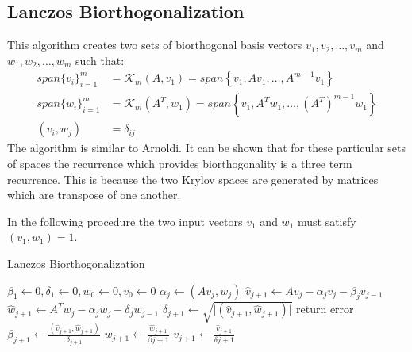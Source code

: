 \subsection{Lanczos Biorthogonalization}
This algorithm creates two sets of biorthogonal basis vectors $v_1, v_2, \dots, v_m$ and $w_1, w_2, \dots, w_m$ such that:
\begin{align}
	span\{v_i\}^m_{i=1} &= \mathcal{K}_m(A, v_1) = span\left\{v_1, Av_1, \dots, A^{m-1}v_1\right\}\\
	span\{w_i\}^m_{i=1} &= \mathcal{K}_m(A^T, w_1) = span\left\{v_1, A^Tw_1, \dots, (A^T)^{m-1}w_1\right\} \\
	(v_i, w_j) &= \delta_{ij}
\end{align}
The algorithm is similar to Arnoldi. It can be shown \cite{saad-sparse} that for these particular sets of spaces the recurrence which provides biorthogonality is a three term recurrence. This is because the two Krylov spaces are generated by matrices which are transpose of one another.

In the following procedure the two input vectors $v_1$ and $w_1$ must satisfy $(v_1, w_1) = 1$.

\begin{algorithm}[H]
 \centering
 \caption{Lanczos Biorthogonalization}\label{alg:BiLanczos}
 \begin{algorithmic}[1]
			\State $\beta_1 \gets 0, \delta_1 \gets 0, w_0 \gets 0, v_0 \gets 0$
				\State $\alpha_j \gets (Av_j, w_j)$
				\State $\hat{v}_{j+1} \gets Av_j - \alpha_j v_j - \beta_jv_{j-1}$
				\State $\hat{w}_{j+1} \gets A^Tw_j - \alpha_j w_j - \delta_j w_{j-1}$
				\State $\delta_{j+1} \gets \sqrt{\vert(\hat{v}_{j+1}, \hat{w}_{j+1})\vert}$
					\State return error
				\EndIf
				\State $\beta_{j+1} \gets \frac{(\hat{v}_{j+1}, \hat{w}_{j+1})}{\delta_{j+1}}$
				\State $w_{j+1} \gets \frac{\hat{w}_{j+1}}{\beta{j+1}}$
				\State $v_{j+1} \gets \frac{\hat{v}_{j+1}}{\delta{j+1}}$
			\EndFor
		\EndProcedure
 \end{algorithmic}
\end{algorithm}

